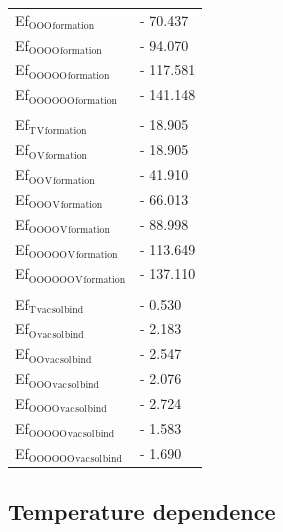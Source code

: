\documentclass[11pt]{article}
\begin{document}
\begin{center}
\begin{tabular}{ll}
Ef\(_{\text{OOO}}\)\(_{\text{formation}}\) & -  70.437\\
Ef\(_{\text{OOOO}}\)\(_{\text{formation}}\) & -  94.070\\
Ef\(_{\text{OOOOO}}\)\(_{\text{formation}}\) & - 117.581\\
Ef\(_{\text{OOOOOO}}\)\(_{\text{formation}}\) & - 141.148\\
 & \\
Ef\(_{\text{T}}\)\(_{\text{V}}\)\(_{\text{formation}}\) & -  18.905\\
Ef\(_{\text{O}}\)\(_{\text{V}}\)\(_{\text{formation}}\) & -  18.905\\
Ef\(_{\text{OO}}\)\(_{\text{V}}\)\(_{\text{formation}}\) & -  41.910\\
Ef\(_{\text{OOO}}\)\(_{\text{V}}\)\(_{\text{formation}}\) & -  66.013\\
Ef\(_{\text{OOOO}}\)\(_{\text{V}}\)\(_{\text{formation}}\) & -  88.998\\
Ef\(_{\text{OOOOO}}\)\(_{\text{V}}\)\(_{\text{formation}}\) & - 113.649\\
Ef\(_{\text{OOOOOO}}\)\(_{\text{V}}\)\(_{\text{formation}}\) & - 137.110\\
 & \\
Ef\(_{\text{T}}\)\(_{\text{vac}}\)\(_{\text{sol}}\)\(_{\text{bind}}\) & -   0.530\\
Ef\(_{\text{O}}\)\(_{\text{vac}}\)\(_{\text{sol}}\)\(_{\text{bind}}\) & -   2.183\\
Ef\(_{\text{OO}}\)\(_{\text{vac}}\)\(_{\text{sol}}\)\(_{\text{bind}}\) & -   2.547\\
Ef\(_{\text{OOO}}\)\(_{\text{vac}}\)\(_{\text{sol}}\)\(_{\text{bind}}\) & -   2.076\\
Ef\(_{\text{OOOO}}\)\(_{\text{vac}}\)\(_{\text{sol}}\)\(_{\text{bind}}\) & -  2.724\\
Ef\(_{\text{OOOOO}}\)\(_{\text{vac}}\)\(_{\text{sol}}\)\(_{\text{bind}}\) & - 1.583\\
Ef\(_{\text{OOOOOO}}\)\(_{\text{vac}}\)\(_{\text{sol}}\)\(_{\text{bind}}\) & - 1.690\\
\end{tabular}
\end{center}


\subsection{Temperature dependence}
\label{sec:org13db74d}
\end{document}
